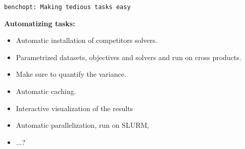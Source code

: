\documentclass{beamer}
\begin{document}
\begin{frame}{\texttt{benchopt: Making tedious tasks easy}}

    {\bf Automatizing tasks:}\\[1.2em]
    \begin{itemize}\itemsep.7em
        \item Automatic installation of competitors solvers.
        \item Parametrized datasets, objectives and solvers and run on cross products.
        \item Make sure to quantify the variance.
        \item Automatic caching.
        \item Interactive visualization of the results
        \item Automatic parallelization, run on SLURM,
        \item ...?
    \end{itemize}
\end{frame}





\appendix
\end{document}
